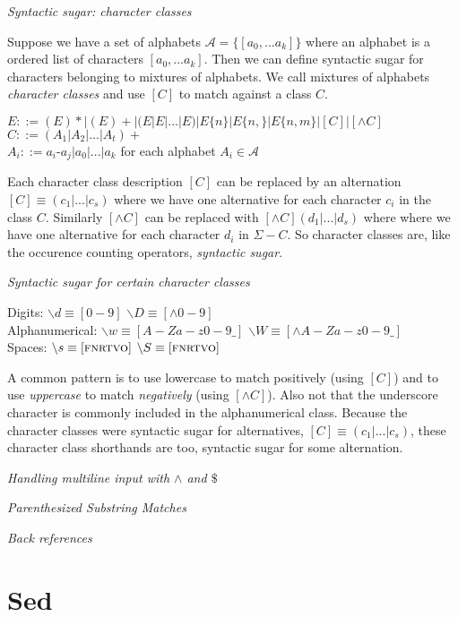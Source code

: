 \textit{Syntactic sugar: character classes}

Suppose we have a set of alphabets $\mathcal{A} = \{[a_0,...a_k]\}$ 
where an alphabet is a ordered list of characters $[a_0,...a_k]$. Then 
we can define syntactic sugar for characters belonging to mixtures of alphabets. 
We call mixtures of alphabets \textit{character classes} and use $[C]$ to match 
against a class $C$. 

$E ::= (E)* | (E)+ | (E|E|...|E) | E\{n\} | E\{n,\} | E\{n,m\} | [C] | [\wedge C] $\\
$C ::= (A_1|A_2|...|A_t)+ $\\
$A_i ::= a_i\text{-}a_j | a_0 | ... | a_k $ for each alphabet $A_i \in \mathcal{A}$

Each character class description $[C]$ can be replaced by an alternation $[C] \equiv (c_1|...|c_s)$
where we have one alternative for each character $c_i$ in the class $C$. 
Similarly $[\wedge C]$ can be replaced with $[\wedge C] (d_1|...|d_s)$ where 
where we have one alternative for each character $d_i$ in $\Sigma - C$. 
So character classes are, like the occurence counting operators, \textit{syntactic sugar}.

\frmrule 

\textit{Syntactic sugar for certain character classes}


Digits: $\backslash  d \equiv [0-9]$  $\backslash  D \equiv [\wedge 0-9]$ \\
Alphanumerical:  $\backslash  w \equiv [A-Za-z0-9 \_]$  $\backslash  W \equiv [\wedge A-Za-z0-9\_]$ \\
Spaces:  $\backslash  s \equiv [\textsc{fnrtvo}]$  $\backslash  S \equiv [\textsc{fnrtvo}]$ 

A common pattern is to use lowercase to match positively (using $[C]$) 
and to use \textit{uppercase} to match \textit{negatively} (using $[\wedge C]$).
Also not that the underscore character is commonly included in the alphanumerical class.
Because the character classes were syntactic sugar for alternatives, $[C] \equiv (c_1|...|c_s)$, 
these character class shorthands are too, syntactic sugar for some alternation.


\frmrule 

\textit{Handling multiline input with $\wedge$ and $\$$}

\frmrule 

\textit{Parenthesized Substring Matches}

\frmrule 

\textit{Back references}




\section{Sed}


